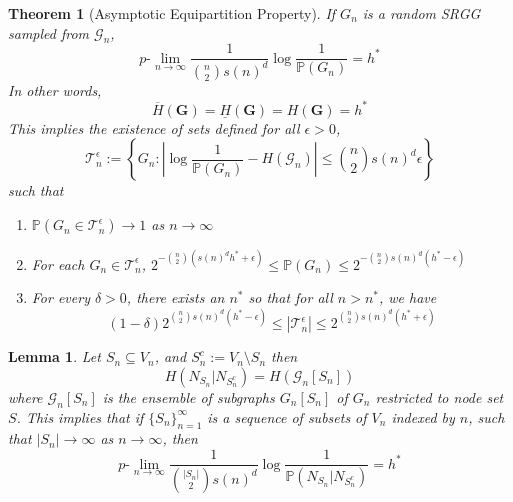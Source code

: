 \documentclass[10pt,a4paper]{amsart}
\newtheorem{theorem}{Theorem}
\newtheorem{lemma}{Lemma}
\newcommand{\graph}{\mathcal{G}}
\newcommand{\plim}[0]{p\mbox{-}\lim}
\newcommand{\prob}[1]{\mathbb{P}\left(#1\right)}
\newcommand{\tti}{\rightarrow\infty}
\begin{document}
\begin{theorem}[Asymptotic Equipartition Property]
    \label{thm:aep}
    If $G_n$ is a random SRGG sampled from $\graph_n$,
    \begin{equation}
        \plim_{n\tti} \frac{1}{\binom{n}{2}s(n)^d} \log \frac{1}{\prob{G_n}} = h^*
    \end{equation} 
    In other words,
    \begin{equation}
        \overline{H}(\mathbf{G}) = \underline{H}(\mathbf{G}) = H(\mathbf{G}) = h^*
    \end{equation}
    This implies the existence of sets defined for all $\epsilon > 0$,
    \begin{equation}
        \mathcal{T}_n^\epsilon := \left\{G_n : \left|\log \frac{1}{\prob{G_n}} - H(\graph_n)\right| \leq \binom{n}{2}s(n)^d \epsilon\right\} 
    \end{equation}
    such that
    \begin{enumerate}
        \item $\prob{G_n \in \mathcal{T}_n^\epsilon} \to 1$ as $n\tti$
        \item For each $G_n \in \mathcal{T}_n^\epsilon$, $2^{-\binom{n}{2}(s(n)^dh^* +\epsilon)} \leq \prob{G_n} \leq 2^{-\binom{n}{2}s(n)^d(h^*- \epsilon)}$
        \item For every $\delta > 0$, there exists an $n^*$ so that for all $n > n^*$, we have
        \begin{equation}
            (1-\delta)2^{\binom{n}{2}s(n)^d(h^*-\epsilon)} \leq |\mathcal{T}_n^\epsilon| \leq 2^{\binom{n}{2}s(n)^d(h^*+\epsilon)}
        \end{equation}
    \end{enumerate}
\end{theorem}

\begin{lemma}
    \label{thm:nbhd_reduction}
    Let $S_n \subseteq V_n$, and $S_n^c := V_n \setminus S_n$ then
    \begin{equation}
        H(N_{S_n}|N_{S_n^c}) = H(\graph_n[S_n])
    \end{equation}
    where $\graph_n[S_n]$ is the ensemble of subgraphs $G_n[S_n]$ of $G_n$ restricted to node set $S$. This implies that if $\{S_n\}_{n=1}^\infty$ is a sequence of subsets of $V_n$ indexed by $n$, such that $|S_n| \to \infty$ as $n\tti$, then
    \begin{equation}
        \label{eq:nbhd_aep}
        \plim_{n\tti} \frac{1}{\binom{|S_n|}{2}s(n)^d}\log \frac{1}{\prob{N_{S_n}|N_{S_n^c}}} = h^* 
    \end{equation}
\end{lemma}
\end{document}
